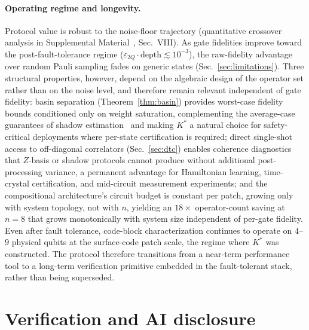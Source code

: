 \documentclass[twocolumn,prx,aps,superscriptaddress,longbibliography,floatfix]{revtex4-2}
\begin{document}
\paragraph*{Operating regime and longevity.}
Protocol value is robust to the noise-floor trajectory
(quantitative crossover analysis in Supplemental
Material~\cite{supplemental}, Sec.~VIII).
As gate fidelities improve toward the post-fault-tolerance regime
($\varepsilon_{2Q}\!\cdot\!\text{depth} \lesssim 10^{-3}$), the
raw-fidelity advantage over random Pauli sampling fades on generic
states (Sec.~\ref{sec:limitations}).  Three structural properties,
however, depend on the algebraic design of the operator set rather
than on the noise level, and therefore remain relevant
independent of gate fidelity:
basin separation (Theorem~\ref{thm:basin}) provides worst-case
fidelity bounds conditioned only on weight saturation, complementing
the average-case guarantees of shadow estimation~\cite{Huang2020}
and making $K^*$ a natural choice for safety-critical deployments
where per-state certification is required;
direct single-shot access to off-diagonal correlators
(Sec.~\ref{sec:dtc}) enables coherence diagnostics that $Z$-basis
or shadow protocols cannot produce without additional
post-processing variance, a permanent advantage for Hamiltonian
learning, time-crystal certification, and mid-circuit measurement
experiments;
and the compositional architecture's circuit budget is constant
per patch, growing only with system topology, not with $n$,
yielding an $18\times$ operator-count saving at $n = 8$ that grows
monotonically with system size independent of per-gate fidelity.
Even after fault tolerance, code-block characterization continues
to operate on $4$--$9$ physical qubits at the surface-code patch
scale, the regime where $K^*$ was constructed.
The protocol therefore transitions from a near-term
performance tool to a long-term verification primitive embedded
in the fault-tolerant stack, rather than being superseded.

\section*{Verification and AI disclosure}
\end{document}
